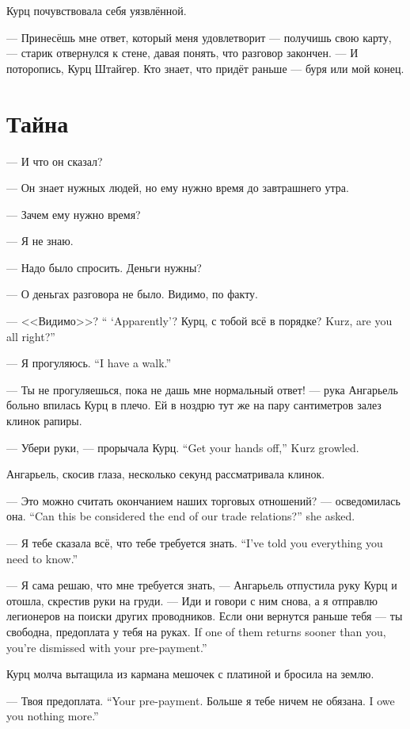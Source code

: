 Курц почувствовала себя уязвлённой.

--- Принесёшь мне ответ, который меня удовлетворит --- получишь свою карту, --- старик отвернулся к стене, давая понять, что разговор закончен.
--- И поторопись, Курц Штайгер.
Кто знает, что придёт раньше --- буря или мой конец.

\section{Тайна}

--- И что он сказал?

--- Он знает нужных людей, но ему нужно время до завтрашнего утра.

--- Зачем ему нужно время?

--- Я не знаю.

--- Надо было спросить.
Деньги нужны?

--- О деньгах разговора не было.
Видимо, по факту.

{--- <<Видимо>>?}
{`` `Apparently'?}
{Курц, с тобой всё в порядке?}
{Kurz, are you all right?''}

{--- Я прогуляюсь.}
{``I have a walk.''}

--- Ты не прогуляешься, пока не дашь мне нормальный ответ! --- рука Ангарьель больно впилась Курц в плечо.
Ей в ноздрю тут же на пару сантиметров залез клинок рапиры.

{--- Убери руки, --- прорычала Курц.}
{``Get your hands off,'' Kurz growled.}

Ангарьель, скосив глаза, несколько секунд рассматривала клинок.

{--- Это можно считать окончанием наших торговых отношений? --- осведомилась она.}
{``Can this be considered the end of our trade relations?'' she asked.}

{--- Я тебе сказала всё, что тебе требуется знать.}
{``I've told you everything you need to know.''}

--- Я сама решаю, что мне требуется знать, --- Ангарьель отпустила руку Курц и отошла, скрестив руки на груди.
--- Иди и говори с ним снова, а я отправлю легионеров на поиски других проводников.
{Если они вернутся раньше тебя --- ты свободна, предоплата у тебя на руках.}
{If one of them returns sooner than you, you're dismissed with your pre-payment.''}

Курц молча вытащила из кармана мешочек с платиной и бросила на землю.

{--- Твоя предоплата.}
{``Your pre-payment.}
{Больше я тебе ничем не обязана.}
{I owe you nothing more.''}

